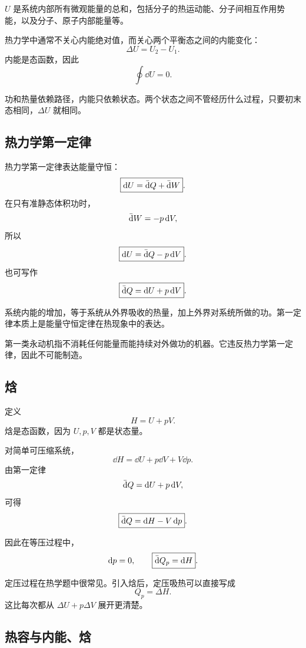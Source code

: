  \(U\) 是系统内部所有微观能量的总和，包括分子的热运动能、分子间相互作用势能，以及分子、原子内部能量等。

热力学中通常不关心内能绝对值，而关心两个平衡态之间的内能变化：
\[
  \Delta U=U_2-U_1.
\]
内能是态函数，因此
\[
  \oint\dd U=0.
\]

\begin{WarnBox}
功和热量依赖路径，内能只依赖状态。两个状态之间不管经历什么过程，只要初末态相同，\(\Delta U\) 就相同。
\end{WarnBox}

\subsection{热力学第一定律}

热力学第一定律表达能量守恒：
\[
  \boxed{
  \mathop{}\!\mathrm{d} U=\mathop{}\!\bar{\mathrm{d}} Q+\mathop{}\!\bar{\mathrm{d}} W
  }.
\]
在只有准静态体积功时，
\[
  \mathop{}\!\bar{\mathrm{d}} W=-p\mathop{}\!\mathrm{d} V,
\]
所以
\[
  \boxed{
  \mathop{}\!\mathrm{d} U=\mathop{}\!\bar{\mathrm{d}} Q-p\mathop{}\!\mathrm{d} V
  }.
\]
也可写作
\[
  \boxed{
  \mathop{}\!\bar{\mathrm{d}} Q=\mathop{}\!\mathrm{d} U+p\mathop{}\!\mathrm{d} V
  }.
\]

\begin{KeyBox}[第一定律的物理意义]
系统内能的增加，等于系统从外界吸收的热量，加上外界对系统所做的功。第一定律本质上是能量守恒定律在热现象中的表达。
\end{KeyBox}

\begin{WarnBox}[第一类永动机]
第一类永动机指不消耗任何能量而能持续对外做功的机器。它违反热力学第一定律，因此不可能制造。
\end{WarnBox}

\subsection{焓}

定义
\[
  \boxed{
  H=U+pV
  }.
\]
焓是态函数，因为 \(U,p,V\) 都是状态量。

对简单可压缩系统，
\[
  \dd H=\dd U+p\dd V+V\dd p.
\]
由第一定律
\[
  \mathop{}\!\bar{\mathrm{d}} Q=\mathop{}\!\mathrm{d} U+p\mathop{}\!\mathrm{d} V,
\]
可得
\[
  \boxed{
  \mathop{}\!\bar{\mathrm{d}} Q=\mathop{}\!\mathrm{d} H-V\mathop{}\!\mathrm{d} p
  }.
\]

因此在等压过程中，
\[
  \mathop{}\!\mathrm{d} p=0,
  \qquad
  \boxed{
  \mathop{}\!\bar{\mathrm{d}} Q_p=\mathop{}\!\mathrm{d} H
  }.
\]

\begin{KeyBox}[为什么要引入焓]
定压过程在热学题中很常见。引入焓后，定压吸热可以直接写成
\[
  Q_p=\Delta H.
\]
这比每次都从 \(\Delta U+p\Delta V\) 展开更清楚。
\end{KeyBox}

\subsection{热容与内能、焓}


